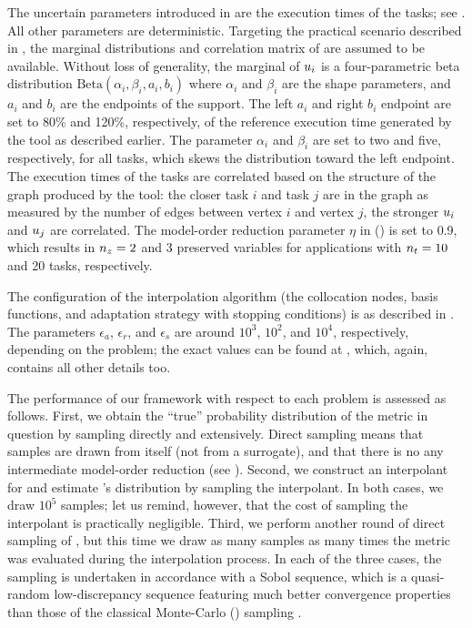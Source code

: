 The uncertain parameters \vu introduced in  are the execution
times of the tasks; see . All other parameters are deterministic.
Targeting the practical scenario described in , the marginal
distributions and correlation matrix of \vu are assumed to be available. Without
loss of generality, the marginal of $u_i$ is a four-parametric beta
distribution $\text{Beta}(\alpha_i, \beta_i, a_i, b_i)$ where $\alpha_i$ and
$\beta_i$ are the shape parameters, and $a_i$ and $b_i$ are the endpoints of the
support. The left $a_i$ and right $b_i$ endpoint are set to 80\% and 120\%,
respectively, of the reference execution time generated by the  tool as
described earlier. The parameter $\alpha_i$ and $\beta_i$ are set to two and
five, respectively, for all tasks, which skews the distribution toward the left
endpoint. The execution times of the tasks are correlated based on the structure
of the graph produced by the  tool: the closer task $i$ and task $j$
are in the graph as measured by the number of edges between vertex $i$ and
vertex $j$, the stronger $u_i$ and $u_j$ are correlated. The model-order
reduction parameter $\eta$ in  () is set to
0.9, which results in ${n_{z}} = 2$ and 3 preserved variables for applications with
${n_{t}} = 10$ and 20 tasks, respectively.

The configuration of the interpolation algorithm (the collocation nodes, basis
functions, and adaptation strategy with stopping conditions) is as described in
. The parameters $\epsilon_a$, $\epsilon_r$, and
$\epsilon_s$ are around $10^3$, $10^2$, and $10^4$, respectively, depending on
the problem; the exact values can be found at \cite{sources}, which, again,
contains all other details too.

The performance of our framework with respect to each problem is assessed as
follows. First, we obtain the ``true'' probability distribution of the metric in
question \g by sampling \g directly and extensively. Direct sampling means that
samples are drawn from \g itself (not from a surrogate), and that there is no
any intermediate model-order reduction (see ). Second, we
construct an interpolant for \g and estimate \g's distribution by sampling the
interpolant. In both cases, we draw $10^5$ samples; let us remind, however, that
the cost of sampling the interpolant is practically negligible. Third, we
perform another round of direct sampling of \g, but this time we draw as many
samples as many times the metric was evaluated during the interpolation process.
In each of the three cases, the sampling is undertaken in accordance with a
Sobol sequence, which is a quasi-random low-discrepancy sequence featuring much
better convergence properties than those of the classical Monte-Carlo ()
sampling \cite{joe2008}.

